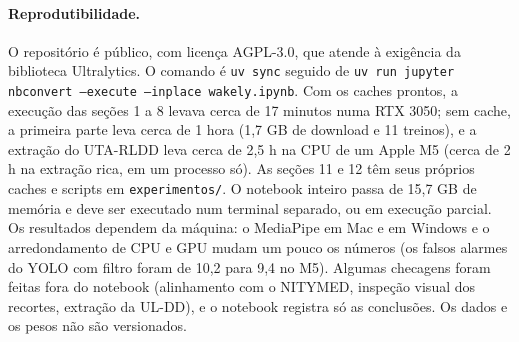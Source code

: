 \documentclass[11pt,a4paper]{article}
\begin{document}
\paragraph{Reprodutibilidade.} O repositório é público, com licença AGPL-3.0, que atende à exigência da biblioteca Ultralytics. O comando é \texttt{uv sync} seguido de \texttt{uv run jupyter nbconvert --execute --inplace wakely.ipynb}. Com os caches prontos, a execução das seções 1 a 8 levava cerca de 17 minutos numa RTX 3050; sem cache, a primeira parte leva cerca de 1 hora (1,7 GB de download e 11 treinos), e a extração do UTA-RLDD leva cerca de 2,5 h na CPU de um Apple M5 (cerca de 2 h na extração rica, em um processo só). As seções 11 e 12 têm seus próprios caches e scripts em \texttt{experimentos/}. O notebook inteiro passa de 15,7 GB de memória e deve ser executado num terminal separado, ou em execução parcial. Os resultados dependem da máquina: o MediaPipe em Mac e em Windows e o arredondamento de CPU e GPU mudam um pouco os números (os falsos alarmes do YOLO com filtro foram de 10,2 para 9,4 no M5). Algumas checagens foram feitas fora do notebook (alinhamento com o NITYMED, inspeção visual dos recortes, extração da UL-DD), e o notebook registra só as conclusões. Os dados e os pesos não são versionados.
\end{document}
